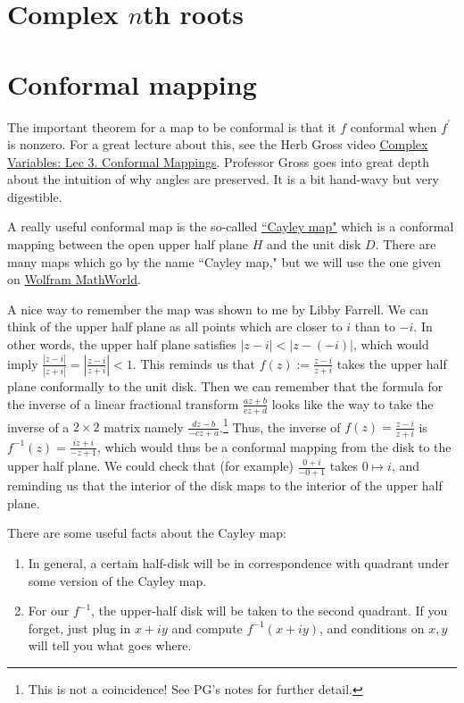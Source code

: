 \documentclass[10pt]{article}
\begin{document}
\section{Complex $n$th roots}

\section{Conformal mapping}

The important theorem for a map to be conformal is that it $f$ conformal when $f^\prime$ is nonzero. For a great lecture about this, see the Herb Gross video \href{https://www.youtube.com/watch?v=s1DFa1dCss0}{Complex Variables: Lec 3. Conformal Mappings}. Professor Gross goes into great depth about the intuition of why angles are preserved. It is a bit hand-wavy but very digestible. 

A really useful conformal map is the so-called \href{http://www-users.math.umn.edu/~garrett/m/complex/notes_2014-15/07_conformal_mapping.pdf}{``Cayley map"} which is a conformal mapping between the open upper half plane $H$ and the unit disk $D$. There are many maps which go by the name ``Cayley map," but we will use the one given on \href{https://mathworld.wolfram.com/CayleyTransform.html}{Wolfram MathWorld}.

A nice way to remember the map was shown to me by Libby Farrell. 
We can think of the upper half plane as all points which are closer to $i$ than to $-i$. 
In other words, the upper half plane satisfies $| z - i | < |z- (-i)|$, which would imply $\frac{|z-i|}{|z+i|}  = \left | \frac{z-i}{z+i} \right |< 1$. 
This reminds us that $f(z) := \frac{z-i}{z+i}$ takes the upper half plane conformally to the unit disk. 
Then we can remember that the formula for the inverse of a linear fractional transform $\frac{az + b}{cz+d}$ looks like the way to take the inverse of a $2\times 2$ matrix namely $\frac{dz - b}{-cz + a}$.\footnote{This is not a coincidence! See PG's notes for further detail.} 
Thus, the inverse of $f(z) = \frac{z-i}{z+i}$ is $f^{-1}(z) = \frac{iz + i}{-z+1}$, which would thus be a conformal mapping from the disk to the upper half plane. We could check that (for example) $\frac{0+i}{-0+1}$ takes $0 \mapsto i$, and reminding us that the interior of the disk maps to the interior of the upper half plane.

There are some useful facts about the Cayley map:
\begin{enumerate}
	\item In general, a certain half-disk will be in correspondence with quadrant under some version of the Cayley map.
	\item For our $f^{-1}$, the upper-half disk will be taken to the second quadrant. If you forget, just plug in $x+iy$ and compute $f^{-1}(x+iy)$, and conditions on $x,y$ will tell you what goes where.
\end{enumerate}
\end{document}
